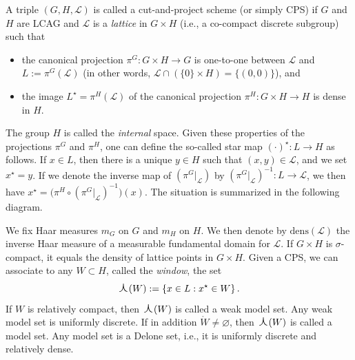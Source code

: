\documentclass[11pt, a4wide]{amsart}
\newcommand{\oplam}{\mbox{\Large $\curlywedge$}}
\newcommand{\cL}{\mathcal L}
\newcommand{\cp}{(G,H,\cL)}
\numberwithin{lemma}{section}
\begin{document}
A triple $\cp$ is called a cut-and-project scheme (or simply CPS) if
$G$ and $H$  are LCAG and
$\cL$ is a {\em lattice\/} in $G\times H$ (i.e., a co-compact
discrete subgroup) such that
\begin{itemize}
\item the canonical projection $\pi^G : G\times H \longrightarrow G$ is
one-to-one between $\cL$ and $L:=\pi^G (\cL)$ (in other words,
$\cL \cap (\{0\}\times H) =\{(0,0)\}$), and
\item the image $L^\star = \pi^{H}(\cL)$ of the canonical
  projection  $\pi^{H} : G\times H
\longrightarrow H$ is dense in $H$.
\end{itemize}
The group $H$ is called the {\em internal} space. Given
these properties of the projections $\pi^G$ and $\pi^H$, one
can define the so-called star map $(\cdot)^\star\!: L \longrightarrow H$ as follows.
If $x\in L$, then there is a unique $y\in H$ such that $(x,y)\in\cL$, and we set $x^\star=y$.
If we denote the inverse map of $(\pi^G|_\cL)$ by $(\pi^G|_\cL)^{-1}:L\to \cL$, we then
have $x^\star = \big( \pi^H \circ (\pi^G|_\cL)^{-1}\big) (x)$.
The situation is summarized in the following diagram.
%
\begin{center}
\end{center}
%
We fix Haar measures $m_G$ on $G$ and $m_H$ on $H$. We then denote by $\mathrm{dens}(\cL)$ the  inverse Haar measure of a measurable fundamental domain for $\cL$.  If $G\times H$ is $\sigma$-compact, it equals  the density of lattice points in $G\times H$. Given a CPS,
we can associate to any $W \subset H$, called the {\em window}, the set
%
\begin{displaymath}
\oplam(W):= \{x \in L : x^{\star} \in W\}\,.
\end{displaymath}
%
If $W$ is relatively compact, then $\oplam(W)$ is called a weak model set. Any weak model set is uniformly discrete. If in addition $\mathring{W}\ne\varnothing$, then $\oplam(W)$ is called a model set. Any model set is a Delone set, i.e., it is uniformly discrete and relatively dense.

\smallskip
\end{document}

